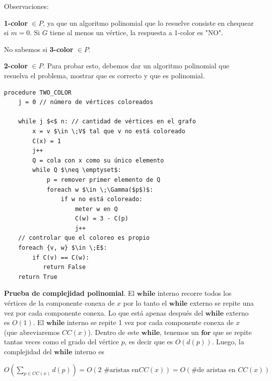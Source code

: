 \documentclass[10pt,a4paper]{article}
\begin{document}
Observaciones:

\textbf{1-color} $\in P$, ya que un algoritmo polinomial que lo resuelve consiste en chequear si $m=0$. Si $G$ tiene al menos un vértice, la respuesta a 1-color es "NO".

No sabemos si \textbf{3-color} $\in P$.

\textbf{2-color} $\in P$. Para probar esto, debemos dar un algoritmo polinomial que resuelva el problema, mostrar que es correcto y que es polinomial.


    \begin{lstlisting}[language=pseudo]
procedure TWO_COLOR
    j = 0 // número de vértices coloreados

    while j $<$ n: // cantidad de vértices en el grafo
        x = v $\in \;V$ tal que v no está coloreado
        C(x) = 1
        j++
        Q = cola con x como su único elemento
        while Q $\neq \emptyset$:
            p = remover primer elemento de Q
            foreach w $\in \;\Gamma($p$)$:
                if w no está coloreado:
                    meter w en Q
                    C(w) = 3 - C(p)
                    j++
    // controlar que el coloreo es propio
    foreach {v, w} $\in \;E$:
        if C(v) == C(w):
           return False
    return True
\end{lstlisting}

\textbf{Prueba de complejidad polinomial}. El $\textbf{while}$ interno recorre todos los vértices de la componente conexa de $x$ por lo tanto el $\textbf{while}$ externo se repite una vez por cada componente conexa. Lo que está apenas después del $\textbf{while}$ externo es $O(1)$. El $\textbf{while}$ interno se repite 1 vez por cada componente conexa de $x$ (que abreviaremos $CC(x)$). Dentro de este $\textbf{while}$, tenemos un $\textbf{for}$ que se repite tantas veces como el grado del vértice $p$, es decir que es $O(d(p))$. Luego, la complejidad del $\textbf{while}$ interno es

\begin{center}
$O(\sum_{p \in CC(x)}d(p)) = O(2\text{ \# aristas en} CC(x)) = O(\text{\# de aristas en }CC(x))$
\end{center}
\end{document}
